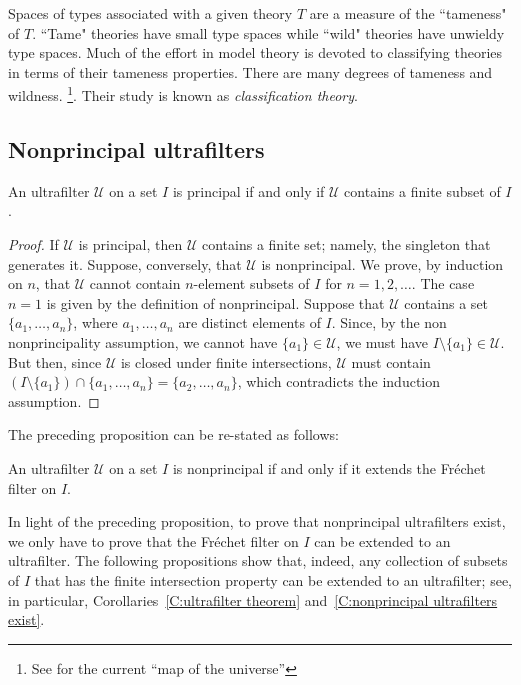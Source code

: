 \documentclass{scrartcl}
\begin{document}
Spaces of types associated with a given theory $T$ are a measure of the ``tameness" of $T$. ``Tame" theories have small type spaces while ``wild" theories have unwieldy type spaces.  Much of the effort in model theory is devoted to classifying theories in terms of their tameness properties. There are many degrees of tameness and wildness.%
\footnote{See  for the current ``map of the universe''}.
Their study is known as \emph{classification theory}.%

\subsection{Nonprincipal ultrafilters}


\begin{proposition}
An ultrafilter $\mathscr{U}$ on a set $I$ is principal if and only if $\mathscr{U}$ contains a finite subset of $I$.
\end{proposition}

\begin{proof}
If $\mathscr{U}$ is principal, then $\mathscr{U}$ contains a finite set; namely, the singleton that generates it. Suppose, conversely, that $\mathscr{U}$ is nonprincipal. We prove, by induction on $n$, that $\mathscr{U}$ cannot contain $n$-element subsets of $I$ for $n=1, 2,\dots$. The case $n=1$ is given by the definition of nonprincipal.  Suppose that $\mathscr{U}$ contains a set $\{a_1,\dots, a_n\}$, where $a_1,\dots, a_n$ are distinct elements of $I$. Since, by the non nonprincipality assumption, we cannot have $\{a_1\}\in \mathscr{U}$, we must have $I\setminus \{a_1\}\in \mathscr{U}$. But then, since $\mathscr{U}$ is closed under finite intersections, $\mathscr{U}$ must contain $(I\setminus \{a_1\})\cap\{a_1,\dots, a_n\}=\{a_2,\dots, a_n\}$, which contradicts the induction assumption.
\end{proof}

The preceding proposition can be re-stated as follows:

\begin{proposition}
\label{P:nonprincipality and Frechet}
An ultrafilter $\mathscr{U}$ on a set $I$ is nonprincipal if and only if it extends the Fr\'echet filter on $I$.
\end{proposition}

In light of the preceding proposition, to prove that nonprincipal ultrafilters exist, we only have to prove that the Fr\'echet filter on $I$ can be extended to an ultrafilter. The following propositions show that, indeed,  any collection of subsets of $I$ that has the finite intersection property can be extended to an ultrafilter; see, in particular, Corollaries~\ref{C:ultrafilter theorem} and~\ref{C:nonprincipal ultrafilters exist}.
\end{document}
